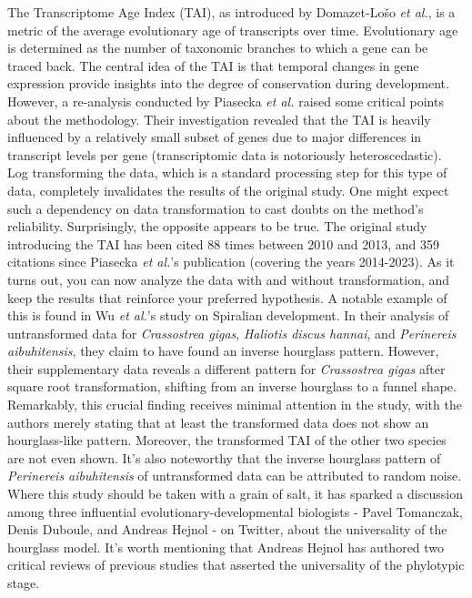 The Transcriptome Age Index (TAI), as introduced by Domazet-Lošo \textit{et al.}, is a metric of the average evolutionary age of transcripts over time\cite{DomazetLoso2010}. Evolutionary age is determined as the number of taxonomic branches to which a gene can be traced back. The central idea of the TAI is that temporal changes in gene expression provide insights into the degree of conservation during development. However, a re-analysis conducted by Piasecka \textit{et al.} raised some critical points about the methodology\cite{Piasecka2013}. Their investigation revealed that the TAI is heavily influenced by a relatively small subset of genes due to major differences in transcript levels per gene (transcriptomic data is notoriously heteroscedastic). Log transforming the data, which is a standard processing step for this type of data, completely invalidates the results of the original study. One might expect such a dependency on data transformation to cast doubts on the method's reliability. Surprisingly, the opposite appears to be true. The original study introducing the TAI has been cited 88 times between 2010 and 2013, and 359 citations since Piasecka \textit{et al.}'s publication (covering the years 2014-2023). As it turns out, you can now analyze the data with and without transformation, and keep the results that reinforce your preferred hypothesis. A notable example of this is found in Wu \textit{et al.}'s study on Spiralian development\cite{Wu2019}. In their analysis of untransformed data for \textit{Crassostrea gigas}, \textit{Haliotis discus hannai}, and \textit{Perinereis aibuhitensis}, they claim to have found an inverse hourglass pattern. However, their supplementary data reveals a different pattern for \textit{Crassostrea gigas} after square root transformation, shifting from an inverse hourglass to a funnel shape. Remarkably, this crucial finding receives minimal attention in the study, with the authors merely stating that at least the transformed data does not show an hourglass-like pattern. Moreover, the transformed TAI of the other two species are not even shown. It's also noteworthy that the inverse hourglass pattern of \textit{Perinereis aibuhitensis} of untransformed data can be attributed to random noise. Where this study should be taken with a grain of salt, it has sparked a discussion among three influential evolutionary-developmental biologists - Pavel Tomanczak, Denis Duboule, and Andreas Hejnol - on Twitter, about the universality of the hourglass model. It's worth mentioning that Andreas Hejnol has authored two critical reviews of previous studies that asserted the universality of the phylotypic stage\cite{Dunn2018,hejnol2016}.


